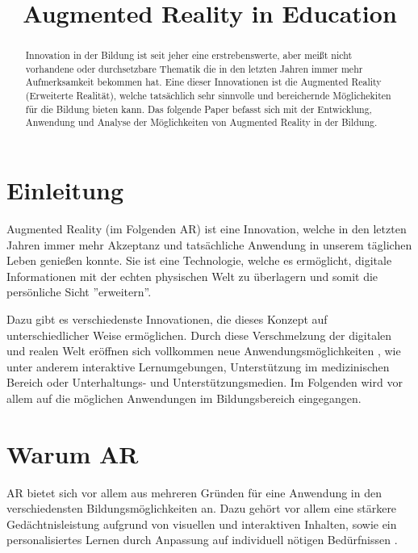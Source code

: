 \documentclass[conference]{IEEEtran}
\begin{document}
\title{Augmented Reality in Education
}

\author{
}
\maketitle

\begin{abstract}
Innovation in der Bildung ist seit jeher eine erstrebenswerte, aber meißt nicht
vorhandene oder durchsetzbare Thematik die in den letzten Jahren immer mehr 
Aufmerksamkeit bekommen hat. Eine dieser Innovationen ist die Augmented Reality
(Erweiterte Realität), welche tatsächlich sehr sinnvolle und bereichernde 
Möglichekiten für die Bildung bieten kann.
Das folgende Paper befasst sich mit der Entwicklung, 
Anwendung und Analyse der Möglichkeiten von Augmented Reality 
in der Bildung.
\end{abstract}

\section{Einleitung}
Augmented Reality (im Folgenden AR) ist eine Innovation, welche in den letzten
Jahren immer mehr Akzeptanz und tatsächliche Anwendung in unserem täglichen
Leben genießen konnte. Sie ist eine Technologie, welche es ermöglicht, digitale
Informationen mit der echten physischen Welt zu überlagern und somit die persönliche 
Sicht ''erweitern''.

Dazu gibt es verschiedenste Innovationen, die dieses Konzept 
auf unterschiedlicher Weise ermöglichen. Durch diese Verschmelzung
der digitalen und realen Welt eröffnen sich vollkommen neue Anwendungsmöglichkeiten
, wie unter anderem interaktive Lernumgebungen, Unterstützung im medizinischen Bereich
oder Unterhaltungs- und Unterstützungsmedien. Im Folgenden wird vor allem auf die möglichen 
Anwendungen im Bildungsbereich eingegangen.


\section{Warum AR}

AR bietet sich vor allem aus mehreren Gründen für eine Anwendung in den verschiedensten
Bildungsmöglichkeiten an. Dazu gehört vor allem eine stärkere Gedächtnisleistung aufgrund von
visuellen und interaktiven Inhalten, sowie ein personalisiertes Lernen durch Anpassung 
auf individuell nötigen Bedürfnissen \cite{b1}. 
\end{document}
